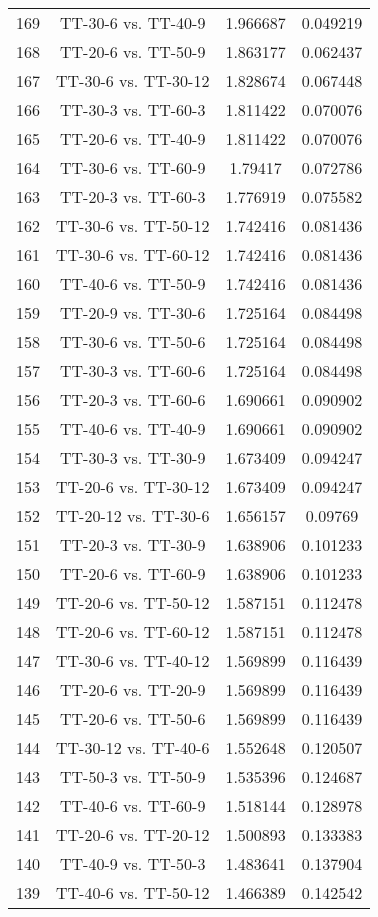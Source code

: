 \documentclass[a4paper,10pt]{article}
\begin{document}
\begin{landscape}
\begin{table}[!htp]
\begin{tabular}{cccc}
169&TT-30-6 vs. TT-40-9&1.966687&0.049219\\
168&TT-20-6 vs. TT-50-9&1.863177&0.062437\\
167&TT-30-6 vs. TT-30-12&1.828674&0.067448\\
166&TT-30-3 vs. TT-60-3&1.811422&0.070076\\
165&TT-20-6 vs. TT-40-9&1.811422&0.070076\\
164&TT-30-6 vs. TT-60-9&1.79417&0.072786\\
163&TT-20-3 vs. TT-60-3&1.776919&0.075582\\
162&TT-30-6 vs. TT-50-12&1.742416&0.081436\\
161&TT-30-6 vs. TT-60-12&1.742416&0.081436\\
160&TT-40-6 vs. TT-50-9&1.742416&0.081436\\
159&TT-20-9 vs. TT-30-6&1.725164&0.084498\\
158&TT-30-6 vs. TT-50-6&1.725164&0.084498\\
157&TT-30-3 vs. TT-60-6&1.725164&0.084498\\
156&TT-20-3 vs. TT-60-6&1.690661&0.090902\\
155&TT-40-6 vs. TT-40-9&1.690661&0.090902\\
154&TT-30-3 vs. TT-30-9&1.673409&0.094247\\
153&TT-20-6 vs. TT-30-12&1.673409&0.094247\\
152&TT-20-12 vs. TT-30-6&1.656157&0.09769\\
151&TT-20-3 vs. TT-30-9&1.638906&0.101233\\
150&TT-20-6 vs. TT-60-9&1.638906&0.101233\\
149&TT-20-6 vs. TT-50-12&1.587151&0.112478\\
148&TT-20-6 vs. TT-60-12&1.587151&0.112478\\
147&TT-30-6 vs. TT-40-12&1.569899&0.116439\\
146&TT-20-6 vs. TT-20-9&1.569899&0.116439\\
145&TT-20-6 vs. TT-50-6&1.569899&0.116439\\
144&TT-30-12 vs. TT-40-6&1.552648&0.120507\\
143&TT-50-3 vs. TT-50-9&1.535396&0.124687\\
142&TT-40-6 vs. TT-60-9&1.518144&0.128978\\
141&TT-20-6 vs. TT-20-12&1.500893&0.133383\\
140&TT-40-9 vs. TT-50-3&1.483641&0.137904\\
139&TT-40-6 vs. TT-50-12&1.466389&0.142542\\

\end{tabular}
\end{table}
\end{landscape}
\end{document}
